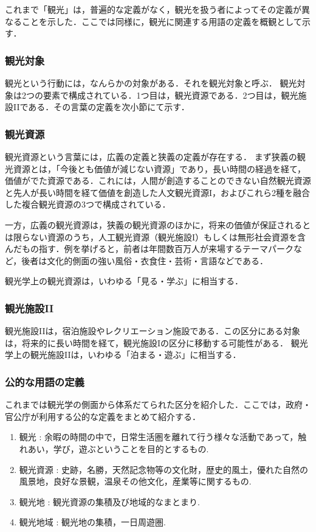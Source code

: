 \documentclass{jsarticle}
\begin{document}
これまで「観光」は，普遍的な定義がなく，観光を扱う者によってその定義が異なることを示した．ここでは同様に，観光に関連する用語の定義を概観として示す．

\subsubsection{観光対象}

観光という行動には，なんらかの対象がある．それを観光対象と呼ぶ\cite{yokomizo_1998}．
観光対象は2つの要素で構成されている．1つ目は，観光資源である．2つ目は，観光施設IIである．その言葉の定義を次小節にて示す．

\subsubsection{観光資源}

観光資源という言葉には，広義の定義と狭義の定義が存在する．
まず狭義の観光資源とは，「今後とも価値が減じない資源」であり，長い時間の経過を経て，価値がでた資源である．これには，人間が創造することのできない自然観光資源と先人が長い時間を経て価値を創造した人文観光資源I，およびこれら2種を融合した複合観光資源の3つで構成されている．

一方，広義の観光資源は，狭義の観光資源のほかに，将来の価値が保証されるとは限らない資源のうち，人工観光資源（観光施設I）もしくは無形社会資源を含んだもの指す．例を挙げると，前者は年間数百万人が来場するテーマパークなど，後者は文化的側面の強い風俗・衣食住・芸術・言語などである．

観光学上の観光資源は，いわゆる「見る・学ぶ」に相当する．

\subsubsection{観光施設II}

観光施設IIは，宿泊施設やレクリエーション施設である．この区分にある対象は，将来的に長い時間を経て，観光施設Iの区分に移動する可能性がある．
観光学上の観光施設IIは，いわゆる「泊まる・遊ぶ」に相当する．


\subsubsection{公的な用語の定義}

これまでは観光学の側面から体系だてられた区分を紹介した．ここでは，政府・官公庁が利用する公的な定義をまとめて紹介する．

\begin{enumerate}
\item 観光      : 余暇の時間の中で，日常生活圏を離れて行う様々な活動であって，触れあい，学び，遊ぶということを目的とするもの\cite{toshin_1995}.
\item 観光資源  : 史跡，名勝，天然記念物等の文化財，歴史的風土，優れた自然の風景地，良好な景観，温泉その他文化，産業等に関するもの\cite{tourism_law_2007}.
\item 観光地    : 観光資源の集積及び地域的なまとまり\cite{tourism_kensetsu_1974}.
\item 観光地域  : 観光地の集積，一日周遊圏\cite{tourism_kensetsu_1974}.
\end{enumerate}
\end{document}
